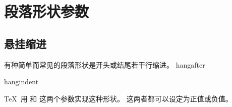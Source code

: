 \documentclass{book}
\begin{document}
\section{段落形状参数}

\subsection{悬挂缩进}

有种简单而常见的段落形状是开头或结尾若干行缩进。
\cstoidx hangafter\par\cstoidx hangindent\par
\TeX\ 用  和  这两个参数实现这种形状。
这两者都可以设定为正值或负值。
\end{document}
